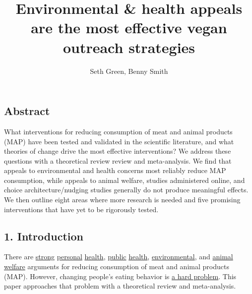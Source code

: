 \documentclass[
  letterpaper,
  DIV=11,
  numbers=noendperiod]{scrartcl}
\title{Environmental \& health appeals are the most effective vegan
outreach strategies}
\author{Seth Green, Benny Smith}
\date{}
\begin{document}
\maketitle
\ifdefined\Shaded\renewenvironment{Shaded}{\begin{tcolorbox}[interior hidden, breakable, frame hidden, borderline west={3pt}{0pt}{shadecolor}, boxrule=0pt, sharp corners, enhanced]}{\end{tcolorbox}}\fi

\hypertarget{abstract}{%
\subsection{Abstract}\label{abstract}}

What interventions for reducing consumption of meat and animal products
(MAP) have been tested and validated in the scientific literature, and
what theories of change drive the most effective interventions? We
address these questions with a theoretical review review and
meta-analysis. We find that appeals to environmental and health concerns
most reliably reduce MAP consumption, while appeals to animal welfare,
studies administered online, and choice architecture/nudging studies
generally do not produce meaningful effects. We then outline eight areas
where more research is needed and five promising interventions that have
yet to be rigorously tested.

\hypertarget{introduction}{%
\subsection{1. Introduction}\label{introduction}}

There are
\href{https://jamanetwork.com/journals/jamanetworkopen/fullarticle/2812392?resultClick=3}{strong}
\href{https://www.mayoclinic.org/healthy-lifestyle/nutrition-and-healthy-eating/in-depth/meatless-meals/art-20048193}{personal}
\href{https://europepmc.org/article/med/30209430}{health},
\href{https://pubmed.ncbi.nlm.nih.gov/20010001/}{public}
\href{https://www.theregreview.org/2022/10/12/khodor-how-factory-farming-could-cause-the-next-covid-19/}{health},
\href{https://www.theguardian.com/environment/2023/jul/20/vegan-diet-cuts-environmental-damage-climate-heating-emissions-study}{environmental},
and
\href{https://forum.effectivealtruism.org/topics/farmed-animal-welfare}{animal
welfare} arguments for reducing consumption of meat and animal products
(MAP). However, changing people's eating behavior is
\href{https://forum.effectivealtruism.org/posts/qgaKpgJfGgkZB3fjh/effectiveness-of-a-theory-informed-documentary-to-reduce}{a
hard problem}. This paper approaches that problem with a theoretical
review and meta-analysis.
\end{document}
